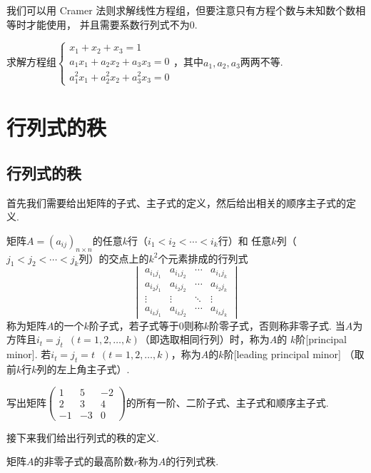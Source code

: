 我们可以用 Cramer 法则求解线性方程组，但要注意只有方程个数与未知数个数相等时才能使用，
并且需要系数行列式不为0.
\begin{example}
    求解方程组$\begin{cases}
        x_1+x_2+x_3=1 \\
        a_1x_1+a_2x_2+a_3x_3=0 \\
        a_1^2x_1+a_2^2x_2+a_3^2x_3=0
    \end{cases}$，其中$a_1,a_2,a_3$两两不等.
\end{example}

\section{行列式的秩}
\subsection{行列式的秩}
首先我们需要给出矩阵的子式、主子式的定义，然后给出相关的顺序主子式的定义.
\begin{definition}
    矩阵$A=(a_{ij})_{n \times n}$的任意$k$行（$i_1<i_2<\cdots<i_k$行）和
    任意$k$列（$j_1<j_2<\cdots<j_k$列）的交点上的$k^2$个元素排成的行列式
    $$\begin{vmatrix}
        a_{i_1j_1} & a_{i_1j_2} & \cdots & a_{i_1j_k} \\
        a_{i_2j_1} & a_{i_2j_2} & \cdots & a_{i_2j_k} \\
        \vdots & \vdots & \ddots  & \vdots \\
        a_{i_kj_1} & a_{i_kj_2} & \cdots & a_{i_kj_k}
    \end{vmatrix}$$
    称为矩阵$A$的一个$k$阶子式，若子式等于$0$则称$k$阶零子式，否则称非零子式.
    当$A$为方阵且$i_t=j_t\enspace(t=1,2,\ldots,k)$（即选取相同行列）时，称为$A$的
    $k$阶[principal minor]. 若$i_t=j_t=t\enspace(t=1,2,\ldots,k)$，称为$A$的$k$阶[leading principal minor]
    （取前$k$行$k$列的左上角主子式）.
\end{definition}
\begin{example}
    写出矩阵$\begin{pmatrix}
        1 & 5 & -2 \\ 2 & 3 & 4 \\ -1 & -3 & 0
    \end{pmatrix}$的所有一阶、二阶子式、主子式和顺序主子式.
\end{example}
接下来我们给出行列式的秩的定义.
\begin{definition}
    矩阵$A$的非零子式的最高阶数$r$称为$A$的行列式秩.
\end{definition}
